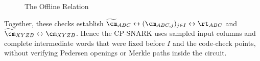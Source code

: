 \begin{figure}[!t]
\begin{tcolorbox}[colback=white, colframe=black]
\end{tcolorbox}
\caption{The Offline Relation}
\label{relation:lamp-off}
\end{figure}
\FloatBarrier

Together, these checks establish
\(\widetilde{\cm}_{ABC}\leftrightarrow
(\cm_{ABC,j})_{j\in I}\leftrightarrow\rt_{ABC}\) and
\(\widetilde{\cm}_{XYZB}\leftrightarrow\cm_{XYZB}\).  Hence the CP-SNARK
uses sampled input columns and complete intermediate words that were fixed
before \(I\) and the code-check points, without verifying Pedersen openings or
Merkle paths inside the circuit.



